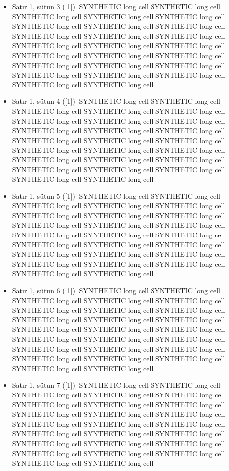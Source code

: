 \documentclass[journal]{IEEEtran}
\begin{document}
\begin{itemize}
\item[5.] Satır 1, sütun 3 ([1]): SYNTHETIC long cell SYNTHETIC long cell SYNTHETIC long cell SYNTHETIC long cell SYNTHETIC long cell SYNTHETIC long cell SYNTHETIC long cell SYNTHETIC long cell SYNTHETIC long cell SYNTHETIC long cell SYNTHETIC long cell SYNTHETIC long cell SYNTHETIC long cell SYNTHETIC long cell SYNTHETIC long cell SYNTHETIC long cell SYNTHETIC long cell SYNTHETIC long cell SYNTHETIC long cell SYNTHETIC long cell SYNTHETIC long cell SYNTHETIC long cell SYNTHETIC long cell SYNTHETIC long cell SYNTHETIC long cell
\item[6.] Satır 1, sütun 4 ([1]): SYNTHETIC long cell SYNTHETIC long cell SYNTHETIC long cell SYNTHETIC long cell SYNTHETIC long cell SYNTHETIC long cell SYNTHETIC long cell SYNTHETIC long cell SYNTHETIC long cell SYNTHETIC long cell SYNTHETIC long cell SYNTHETIC long cell SYNTHETIC long cell SYNTHETIC long cell SYNTHETIC long cell SYNTHETIC long cell SYNTHETIC long cell SYNTHETIC long cell SYNTHETIC long cell SYNTHETIC long cell SYNTHETIC long cell SYNTHETIC long cell SYNTHETIC long cell SYNTHETIC long cell SYNTHETIC long cell
\item[7.] Satır 1, sütun 5 ([1]): SYNTHETIC long cell SYNTHETIC long cell SYNTHETIC long cell SYNTHETIC long cell SYNTHETIC long cell SYNTHETIC long cell SYNTHETIC long cell SYNTHETIC long cell SYNTHETIC long cell SYNTHETIC long cell SYNTHETIC long cell SYNTHETIC long cell SYNTHETIC long cell SYNTHETIC long cell SYNTHETIC long cell SYNTHETIC long cell SYNTHETIC long cell SYNTHETIC long cell SYNTHETIC long cell SYNTHETIC long cell SYNTHETIC long cell SYNTHETIC long cell SYNTHETIC long cell SYNTHETIC long cell SYNTHETIC long cell
\item[8.] Satır 1, sütun 6 ([1]): SYNTHETIC long cell SYNTHETIC long cell SYNTHETIC long cell SYNTHETIC long cell SYNTHETIC long cell SYNTHETIC long cell SYNTHETIC long cell SYNTHETIC long cell SYNTHETIC long cell SYNTHETIC long cell SYNTHETIC long cell SYNTHETIC long cell SYNTHETIC long cell SYNTHETIC long cell SYNTHETIC long cell SYNTHETIC long cell SYNTHETIC long cell SYNTHETIC long cell SYNTHETIC long cell SYNTHETIC long cell SYNTHETIC long cell SYNTHETIC long cell SYNTHETIC long cell SYNTHETIC long cell SYNTHETIC long cell
\item[9.] Satır 1, sütun 7 ([1]): SYNTHETIC long cell SYNTHETIC long cell SYNTHETIC long cell SYNTHETIC long cell SYNTHETIC long cell SYNTHETIC long cell SYNTHETIC long cell SYNTHETIC long cell SYNTHETIC long cell SYNTHETIC long cell SYNTHETIC long cell SYNTHETIC long cell SYNTHETIC long cell SYNTHETIC long cell SYNTHETIC long cell SYNTHETIC long cell SYNTHETIC long cell SYNTHETIC long cell SYNTHETIC long cell SYNTHETIC long cell SYNTHETIC long cell SYNTHETIC long cell SYNTHETIC long cell SYNTHETIC long cell SYNTHETIC long cell

\end{itemize}
\end{document}
